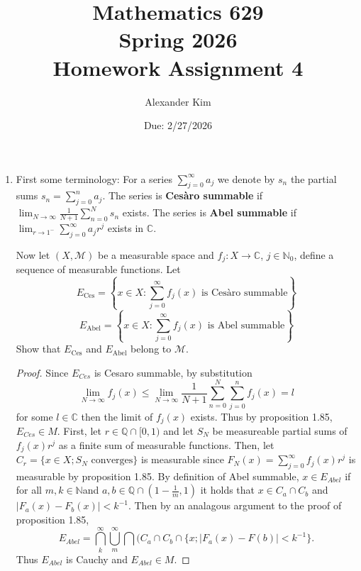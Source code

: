 \documentclass[12pt]{article}
\title{Mathematics 629\\
Spring 2026\\
Homework Assignment 4}
\author{Alexander Kim}
\date{Due: 2/27/2026}
\theoremstyle{definition}
\begin{document}
\maketitle

\begin{enumerate}

	\item First some terminology: For a series $\sum_{j=0}^{\infty} a_j$ we denote by $s_n$ the partial sums $s_n = \sum_{j=0}^{n} a_j$. The series is \textbf{Ces\`{a}ro summable} if $\lim_{N \to \infty} \frac{1}{N+1} \sum_{n=0}^{N} s_n$ exists. The series is \textbf{Abel summable} if $\lim_{r \to 1^{-}} \sum_{j=0}^{\infty} a_j r^j$ exists in $\mathbb{C}$.

	      Now let $(X, \mathcal{M})$ be a measurable space and $f_j : X \to \mathbb{C}$, $j \in \mathbb{N}_0$, define a sequence of measurable functions. Let
	      \[
		      E_{\text{Ces}} = \left\{ x \in X : \sum_{j=0}^{\infty} f_j(x) \text{ is Ces\`{a}ro summable} \right\}
	      \]
	      \[
		      E_{\text{Abel}} = \left\{ x \in X : \sum_{j=0}^{\infty} f_j(x) \text{ is Abel summable} \right\}
	      \]
	      Show that $E_{\text{Ces}}$ and $E_{\text{Abel}}$ belong to $\mathcal{M}$.

	      \begin{proof}
		      Since $E_{Ces}$ is Cesaro summable, by substitution
		      $$\lim_{N \to \infty} f_j(x) \leq 
		      \lim_{N \to \infty} \frac{1}{N+1} \sum_{n=0}^{N}\sum_{j=0}^n f_j(x) = l$$
		      for some $l \in \mathbb{C}$ then the limit of $f_j(x)$ exists. Thus by proposition 
		      1.85, $E_{Ces} \in M$. 
			\newline
			\newline
		      First, let $r \in \mathbb{Q}\cap [0,1)$ and let $S_N$ be measureable partial sums of $f_j(x)r^j$ as a finite sum of measurable functions. Then, let $C_r = \{x \in X
		      ; S_N \text{ converges}\}$ is measurable since $F_N(x) = \sum_{j=0}^{\infty}f_j(x)r^j$ is measurable by proposition 1.85. By definition of Abel summable, $x\in E_{Abel}$ if for all $m, k \in \mathbb{N}$and $a,b \in \mathbb{Q} \cap (1 - \frac{1}{m}, 1)$ 
		      it holds that $x \in C_a \cap C_b$ and $\vert F_a(x) - F_b(x) \vert < k^{-1}$. 
		      Then by an analagous argument to the proof of proposition 1.85, 
		      $$E_{Abel} = \bigcap_{k}^\infty \bigcup_{m}^{\infty} \bigcap 
		      (C_a \cap C_b \cap \{x; \vert F_a(x) - F(b)\vert < k^{-1}\}.$$
		      Thus $E_{Abel}$ is Cauchy and $E_{Abel} \in M$.

	      \end{proof}


\end{enumerate}
\end{document}
